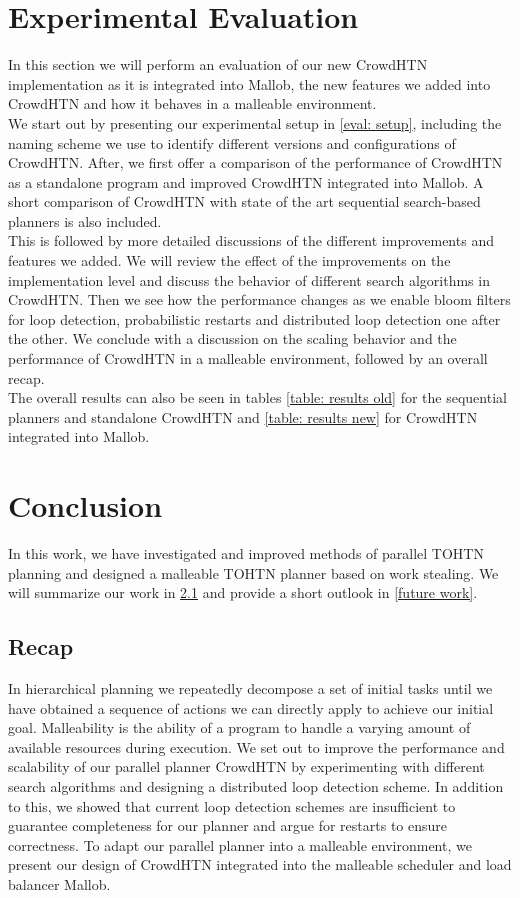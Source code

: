 \documentclass[enabledeprecatedfontcommands,12pt,a4paper,twoside]{scrartcl}
\numberwithin{equation}{section}
\begin{document}
\section{Experimental Evaluation}
\label{eval}
In this section we will perform an evaluation of our new CrowdHTN implementation as it is integrated into Mallob, the new features we added into CrowdHTN and how it behaves in a malleable environment. \\
We start out by presenting our experimental setup in \ref{eval: setup}, including the naming scheme we use to identify different versions and configurations of CrowdHTN. After, we first offer a comparison of the performance of CrowdHTN as a standalone program and improved CrowdHTN integrated into Mallob. A short comparison of CrowdHTN with state of the art sequential search-based planners is also included. \\
This is followed by more detailed discussions of the different improvements and features we added. We will review the effect of the improvements on the implementation level and discuss the behavior of different search algorithms in CrowdHTN. Then we see how the performance changes as we enable bloom filters for loop detection, probabilistic restarts and distributed loop detection one after the other. We conclude with a discussion on the scaling behavior and the performance of CrowdHTN in a malleable environment, followed by an overall recap. \\
The overall results can also be seen in tables \ref{table: results old} for the sequential planners and standalone CrowdHTN and \ref{table: results new} for CrowdHTN integrated into Mallob.

\clearpage
\pagebreak
\section{Conclusion}
\label{conclusion}
In this work, we have investigated and improved methods of parallel TOHTN planning and designed a malleable TOHTN planner based on work stealing. We will summarize our work in \ref{recap} and provide a short outlook in \ref{future work}.

\subsection{Recap}
\label{recap}
In hierarchical planning we repeatedly decompose a set of initial tasks until we have obtained a sequence of actions we can directly apply to achieve our initial goal. Malleability is the ability of a program to handle a varying amount of available resources during execution. We set out to improve the performance and scalability of our parallel planner CrowdHTN by experimenting with different search algorithms and designing a distributed loop detection scheme.
In addition to this, we showed that current loop detection schemes are insufficient to guarantee completeness for our planner and argue for restarts to ensure correctness.
To adapt our parallel planner into a malleable environment, we present our design of CrowdHTN integrated into the malleable scheduler and load balancer Mallob. \\
\end{document}
